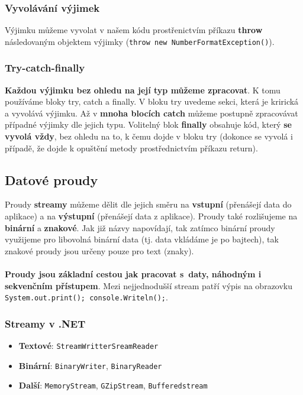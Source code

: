 \subsubsection{Vyvolávání výjimek}
Výjimku můžeme vyvolat v našem kódu prostřenictvím příkazu \textbf{throw} následovaným objektem výjimky (\texttt{throw new NumberFormatException()}).

\subsubsection{Try-catch-finally}
\textbf{Každou výjimku bez ohledu na její typ můžeme zpracovat}. K tomu používáme bloky try, catch a finally. V bloku try uvedeme sekci, která je krirická a vyvolává výjimku. Až v\textbf{ mnoha blocích catch} můžeme postupně zpracovávat případné výjimky dle jejich typu. Volitelný blok \textbf{finally} obsahuje kód, který \textbf{se vyvolá vždy}, bez ohledu na to, k čemu dojde v bloku try (dokonce se vyvolá i případě, že dojde k opuštění metody prostřednictvím příkazu return).



\subsection{Datové proudy}
Proudy \textbf{streamy} můžeme dělit dle jejich směru na \textbf{vstupní} (přenášejí data do aplikace) a na \textbf{výstupní} (přenášejí data z aplikace). Proudy také rozlišujeme na \textbf{binární} a \textbf{znakové}. Jak již názvy napovídají, tak zatímco binární proudy využijeme pro libovolná binární data (tj. data vkládáme je po bajtech), tak znakové proudy jsou určeny pouze pro text (znaky).
\\\\
\textbf{Proudy jsou základní cestou jak pracovat s daty, náhodným i sekvenčním přístupem}. Mezi nejjednodušší stream patří výpis na obrazovku \texttt{System.out.print(); \linebreak console.Writeln();}.

\subsubsection{Streamy v .NET}
\begin{itemize}
	\item \textbf{Textové}: \texttt{StreamWritter}\texttt{SreamReader} 
	\item \textbf{Binární}:	 \texttt{BinaryWriter},	 \texttt{BinaryReader} 
	\item \textbf{Další}:	 \texttt{MemoryStream},	 \texttt{GZipStream},		 \texttt{Bufferedstream} 
\end{itemize}

